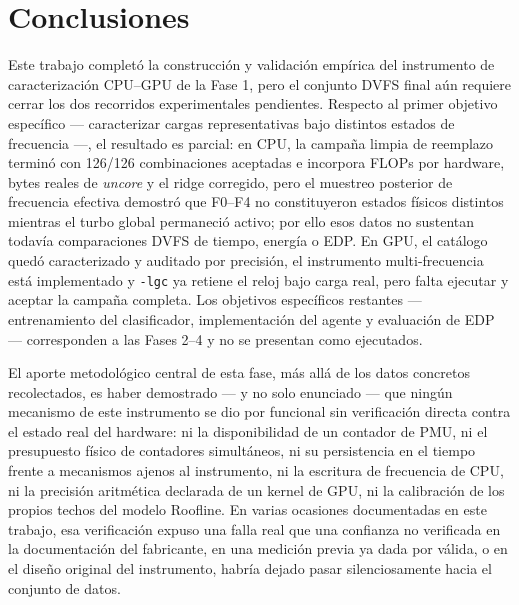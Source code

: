 \documentclass[12pt,oneside,spanish]{book}
\begin{document}

\chapter{Conclusiones}

Este trabajo completó la construcción y validación empírica del instrumento de caracterización CPU--GPU de la Fase 1, pero el conjunto DVFS final aún requiere cerrar los dos recorridos experimentales pendientes. Respecto al primer objetivo específico --- caracterizar cargas representativas bajo distintos estados de frecuencia ---, el resultado es parcial: en CPU, la campaña limpia de reemplazo terminó con 126/126 combinaciones aceptadas e incorpora FLOPs por hardware, bytes reales de \textit{uncore} y el ridge corregido, pero el muestreo posterior de frecuencia efectiva demostró que F0--F4 no constituyeron estados físicos distintos mientras el turbo global permaneció activo; por ello esos datos no sustentan todavía comparaciones DVFS de tiempo, energía o EDP. En GPU, el catálogo quedó caracterizado y auditado por precisión, el instrumento multi-frecuencia está implementado y \texttt{-lgc} ya retiene el reloj bajo carga real, pero falta ejecutar y aceptar la campaña completa. Los objetivos específicos restantes --- entrenamiento del clasificador, implementación del agente y evaluación de EDP --- corresponden a las Fases 2--4 y no se presentan como ejecutados.

El aporte metodológico central de esta fase, más allá de los datos concretos recolectados, es haber demostrado --- y no solo enunciado --- que ningún mecanismo de este instrumento se dio por funcional sin verificación directa contra el estado real del hardware: ni la disponibilidad de un contador de PMU, ni el presupuesto físico de contadores simultáneos, ni su persistencia en el tiempo frente a mecanismos ajenos al instrumento, ni la escritura de frecuencia de CPU, ni la precisión aritmética declarada de un kernel de GPU, ni la calibración de los propios techos del modelo Roofline. En varias ocasiones documentadas en este trabajo, esa verificación expuso una falla real que una confianza no verificada en la documentación del fabricante, en una medición previa ya dada por válida, o en el diseño original del instrumento, habría dejado pasar silenciosamente hacia el conjunto de datos.
\end{document}
